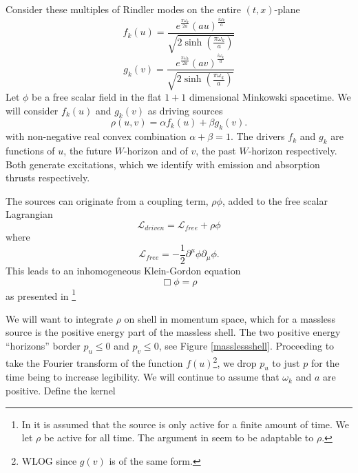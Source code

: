 \documentclass[12pt,a4paper]{article}
\begin{document}
Consider these multiples of Rindler modes on the entire $(t,x)$-plane
\begin{equation}
f_k(u) = \frac{e^{\frac{\pi \omega_k}{2a}} {(au)}^{\frac{i\omega_k}{a}}}{ \sqrt{2\sinh\left(\frac{\pi\omega_k}{a}\right)}}
\end{equation}
\begin{equation}
g_k(v) = \frac{e^{\frac{\pi \omega_k}{2a}} {(av)}^{\frac{i\omega_k}{a}}}{ \sqrt{2\sinh\left(\frac{\pi\omega_k}{a}\right)} }
\end{equation}
Let $\phi$ be a free scalar field in the flat $1+1$ dimensional Minkowski spacetime.  We will consider $f_k(u)$ and $g_k(v)$ as driving sources
\begin{equation}
\label{ab}
\rho(u,v) = \alpha f_k(u) + \beta g_k(v).
\end{equation}
with non-negative real convex combination $\alpha + \beta = 1$. The drivers $f_k$ and $g_k$ are functions of $u$, the future $W$-horizon and of $v$, the past $W$-horizon respectively.  Both generate excitations, which we identify with emission and absorption thrusts respectively.


The sources can originate from a coupling term, $\rho \phi$, added to the free scalar Lagrangian
\begin{equation}
\mathscr{L}_{driven} = \mathscr{L}_{free} + \rho\phi 
\end{equation}
where
\begin{equation}
  \mathscr{L}_{free} = -\frac{1}{2} \partial^\mu \phi \partial_\mu \phi.
\end{equation}
This leads to an inhomogeneous Klein-Gordon equation
\begin{equation}
\Box  \phi = \rho
\end{equation}
as presented in \cite{beisert}\footnote{In \cite{beisert} it is assumed that the source is only active for a finite amount of time.  We let $\rho$ be active for all time.  The argument in \cite{beisert} seem to be adaptable to $\rho$.}

We will want to integrate $\rho$ on shell in momentum space, which for a massless source is the positive energy part of the massless shell.  The two positive energy ``horizons'' border $p_u \le 0$ and $p_v \le 0$, see Figure \ref{masslessshell}.  Proceeding to take the Fourier transform of the function $f(u)$\footnote{WLOG since $g(v)$ is of the same form.}, we drop $p_u$ to just $p$ for the time being to increase legibility.  We will continue to assume that $\omega_k$ and $a$ are positive. Define the kernel
\end{document}
